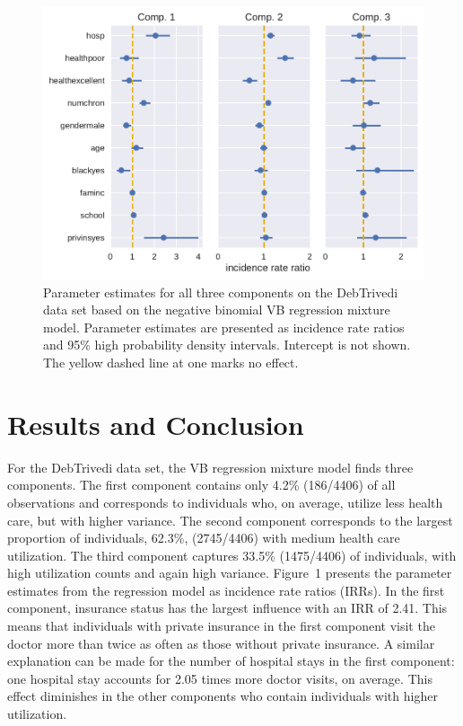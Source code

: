 \documentclass[a4paper,UKenglish]{oasics}
\begin{document}
\begin{figure}[!ht]\centering
	\includegraphics[width=\linewidth]{coefplot.pdf}
	\caption{\label{iter} Parameter estimates for all three components on the DebTrivedi data set based on the negative binomial VB regression mixture model. Parameter estimates are presented as incidence rate ratios and 95\% high probability density intervals. Intercept is not shown. The yellow dashed line at one marks no effect.}
\end{figure}

\section{Results and Conclusion}
For the DebTrivedi data set, the VB regression mixture model finds three components.
The first component contains only 4.2\% (186/4406) of all observations and corresponds to individuals who, on average, utilize less health care, but with higher variance. The second component corresponds to the largest proportion of individuals, 62.3\%, (2745/4406) with medium health care utilization. The third component captures 33.5\% (1475/4406) of individuals, with high utilization counts and again high variance. Figure~1 presents the parameter estimates from the regression model as incidence rate ratios (IRRs). In the first component, insurance status has the largest influence with an IRR of 2.41. This means that individuals with private insurance in the first component visit the doctor more than twice as often as those without private insurance. A similar explanation can be made for the number of hospital stays in the first component: one hospital stay accounts for 2.05 times more doctor visits, on average. This effect diminishes in the other components who contain individuals with higher utilization. 
\end{document}
